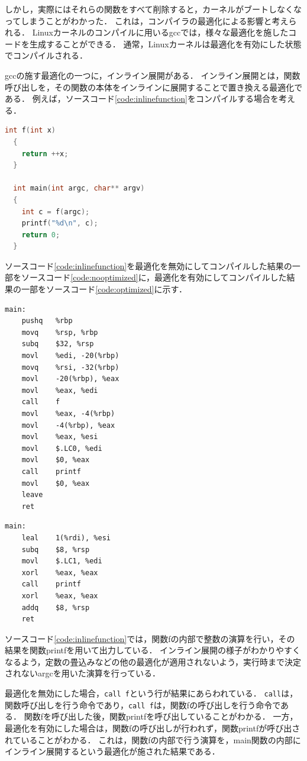 \documentclass[graduation-thesis]{mlarticle}
\begin{document}
しかし，実際にはそれらの関数をすべて削除すると，カーネルがブートしなくなってしまうことがわかった．
これは，コンパイラの最適化による影響と考えられる．
Linuxカーネルのコンパイルに用いるgccでは，様々な最適化を施したコードを生成することができる．
通常，Linuxカーネルは最適化を有効にした状態でコンパイルされる．

gccの施す最適化の一つに，インライン展開がある．
インライン展開とは，関数呼び出しを，その関数の本体をインラインに展開することで置き換える最適化である．
例えば，ソースコード\ref{code:inlinefunction}をコンパイルする場合を考える．

\begin{lstlisting}[language=C, caption=インライン展開のコード例, label=code:inlinefunction]
  int f(int x)
  {
    return ++x;
  }

  int main(int argc, char** argv)
  {
    int c = f(argc);
    printf("%d\n", c);
    return 0;
  }
\end{lstlisting}

ソースコード\ref{code:inlinefunction}を最適化を無効にしてコンパイルした結果の一部をソースコード\ref{code:nooptimized}に，最適化を有効にしてコンパイルした結果の一部をソースコード\ref{code:optimized}に示す．

\begin{lstlisting}[language={[x86masm]Assembler}, caption=最適化を無効にしたコンパイル結果, label=code:nooptimized]
main:
	pushq	%rbp
	movq	%rsp, %rbp
	subq	$32, %rsp
	movl	%edi, -20(%rbp)
	movq	%rsi, -32(%rbp)
	movl	-20(%rbp), %eax
	movl	%eax, %edi
	call	f
	movl	%eax, -4(%rbp)
	movl	-4(%rbp), %eax
	movl	%eax, %esi
	movl	$.LC0, %edi
	movl	$0, %eax
	call	printf
	movl	$0, %eax
	leave
	ret
\end{lstlisting}

\begin{lstlisting}[language={[x86masm]Assembler}, caption=最適化を有効にしたコンパイル結果, label=code:optimized]
main:
	leal	1(%rdi), %esi
	subq	$8, %rsp
	movl	$.LC1, %edi
	xorl	%eax, %eax
	call	printf
	xorl	%eax, %eax
	addq	$8, %rsp
	ret
\end{lstlisting}

ソースコード\ref{code:inlinefunction}では，関数fの内部で整数の演算を行い，その結果を関数printfを用いて出力している．
インライン展開の様子がわかりやすくなるよう，定数の畳込みなどの他の最適化が適用されないよう，実行時まで決定されないargcを用いた演算を行っている．

最適化を無効にした場合，\texttt{call f}という行が結果にあらわれている．
\texttt{call}は，関数呼び出しを行う命令であり，\texttt{call f}は，関数fの呼び出しを行う命令である．
関数fを呼び出した後，関数printfを呼び出していることがわかる．
一方，最適化を有効にした場合は，関数fの呼び出しが行われず，関数printfが呼び出されていることがわかる．
これは，関数fの内部で行う演算を，main関数の内部にインライン展開するという最適化が施された結果である．
\end{document}
